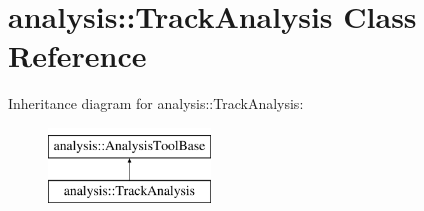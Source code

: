\hypertarget{classanalysis_1_1TrackAnalysis}{}\section{analysis\+:\+:Track\+Analysis Class Reference}
\label{classanalysis_1_1TrackAnalysis}
Inheritance diagram for analysis\+:\+:Track\+Analysis\+:\begin{figure}[H]
\begin{center}
\leavevmode
\includegraphics[height=2.000000cm]{classanalysis_1_1TrackAnalysis}
\end{center}
\end{figure}
